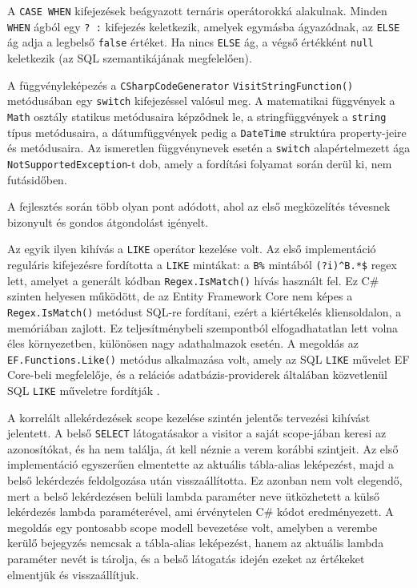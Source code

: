 A \texttt{CASE WHEN} kifejezések beágyazott ternáris operátorokká alakulnak. Minden \texttt{WHEN} ágból egy \texttt{? :} kifejezés keletkezik, amelyek egymásba ágyazódnak, az \texttt{ELSE} ág adja a legbelső \texttt{false} értéket. Ha nincs \texttt{ELSE} ág, a végső értékként \texttt{null} keletkezik (az SQL szemantikájának megfelelően).

A függvényleképezés a \texttt{CSharpCodeGenerator} \texttt{VisitStringFunction()} metódusában egy \texttt{switch} kifejezéssel valósul meg. A matematikai függvények a \texttt{Math} osztály statikus metódusaira képződnek le, a stringfüggvények a \texttt{string} típus metódusaira, a dátumfüggvények pedig a \texttt{DateTime} struktúra property-jeire és metódusaira. Az ismeretlen függvénynevek esetén a \texttt{switch} alapértelmezett ága \texttt{NotSupportedException}-t dob, amely a fordítási folyamat során derül ki, nem futásidőben.


A fejlesztés során több olyan pont adódott, ahol az első megközelítés tévesnek bizonyult és gondos átgondolást igényelt.

Az egyik ilyen kihívás a \texttt{LIKE} operátor kezelése volt. Az első implementáció reguláris kifejezésre fordította a \texttt{LIKE} mintákat: a \texttt{B\%} mintából \texttt{(?i)\^{}B.*\$} regex lett, amelyet a generált kódban \texttt{Regex.IsMatch()} hívás használt fel. Ez C\# szinten helyesen működött, de az Entity Framework Core nem képes a \texttt{Regex.IsMatch()} metódust SQL-re fordítani, ezért a kiértékelés kliensoldalon, a memóriában zajlott. Ez teljesítménybeli szempontból elfogadhatatlan lett volna éles környezetben, különösen nagy adathalmazok esetén. A megoldás az \texttt{EF.Functions.Like()} metódus alkalmazása volt, amely az SQL \texttt{LIKE} művelet EF Core-beli megfelelője, és a relációs adatbázis-providerek általában közvetlenül SQL \texttt{LIKE} műveletre fordítják \cite{mslearn2024eflike}.

A korrelált allekérdezések scope kezelése szintén jelentős tervezési kihívást jelentett. A belső \texttt{SELECT} látogatásakor a visitor a saját scope-jában keresi az azonosítókat, és ha nem találja, át kell néznie a verem korábbi szintjeit. Az első implementáció egyszerűen elmentette az aktuális tábla-alias leképezést, majd a belső lekérdezés feldolgozása után visszaállította. Ez azonban nem volt elegendő, mert a belső lekérdezésen belüli lambda paraméter neve ütközhetett a külső lekérdezés lambda paraméterével, ami érvénytelen C\# kódot eredményezett. A megoldás egy pontosabb scope modell bevezetése volt, amelyben a verembe kerülő bejegyzés nemcsak a tábla-alias leképezést, hanem az aktuális lambda paraméter nevét is tárolja, és a belső látogatás idején ezeket az értékeket elmentjük és visszaállítjuk.

